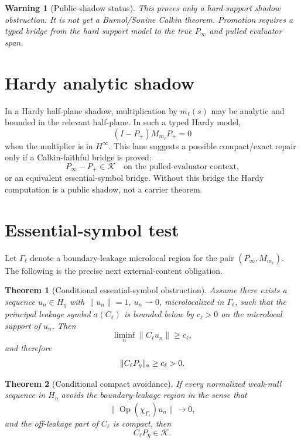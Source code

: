 \documentclass[11pt]{article}
\newtheorem{theorem}{Theorem}
\newtheorem{warning}{Warning}
\begin{document}
\begin{warning}[Public-shadow status]
This proves only a hard-support shadow obstruction.  It is not yet a Burnol/Sonine Calkin theorem.
Promotion requires a typed bridge from the hard support model to the true $P_\infty$ and pulled
evaluator span.
\end{warning}

\section{Hardy analytic shadow}
In a Hardy half-plane shadow, multiplication by $m_\ell(s)$ may be analytic and bounded in the
relevant half-plane.  In such a typed Hardy model,
\[
  (I-P_+)M_{m_\ell}P_+=0
\]
when the multiplier is in $H^\infty$.  This lane suggests a possible compact/exact repair only if a
Calkin-faithful bridge is proved:
\[
  P_\infty-P_+\in\mathcal K
  \quad\text{on the pulled-evaluator context,}
\]
or an equivalent essential-symbol bridge.
Without this bridge the Hardy computation is a public shadow, not a carrier theorem.

\section{Essential-symbol test}
Let $\Gamma_\ell$ denote a boundary-leakage microlocal region for the pair $(P_\infty,M_{m_\ell})$.
The following is the precise next external-content obligation.

\begin{theorem}[Conditional essential-symbol obstruction]
Assume there exists a sequence $u_n\in H_\eta$ with $\|u_n\|=1$, $u_n\rightharpoonup0$, microlocalized
in $\Gamma_\ell$, such that the principal leakage symbol $\sigma(C_\ell)$ is bounded below by
$c_\ell>0$ on the microlocal support of $u_n$.  Then
\[
  \liminf_n\|C_\ell u_n\|\ge c_\ell,
\]
and therefore
\[
  \|C_\ell P_\eta\|_{\rm e}\ge c_\ell>0.
\]
\end{theorem}

\begin{theorem}[Conditional compact avoidance]
If every normalized weak-null sequence in $H_\eta$ avoids the boundary-leakage region in the sense
that
\[
  \|\operatorname{Op}(\chi_{\Gamma_\ell})u_n\|\to0,
\]
and the off-leakage part of $C_\ell$ is compact, then
\[
  C_\ell P_\eta\in\mathcal K.
\]
\end{theorem}
\end{document}

